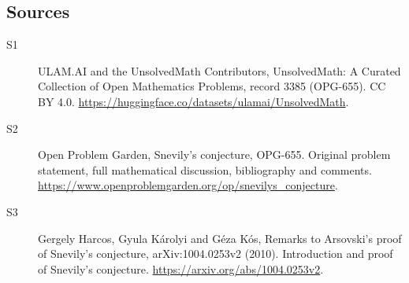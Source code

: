 \documentclass[11pt]{article}
\begin{document}
\subsection{Sources}
\begin{description}
\item[\hypertarget{source:3385:1}{S1}] ULAM.AI and the UnsolvedMath Contributors, UnsolvedMath: A Curated Collection of Open Mathematics Problems, record 3385 (OPG-655). CC BY 4.0. \url{https://huggingface.co/datasets/ulamai/UnsolvedMath}.
\item[\hypertarget{source:3385:2}{S2}] Open Problem Garden, Snevily's conjecture, OPG-655. Original problem statement, full mathematical discussion, bibliography and comments. \url{https://www.openproblemgarden.org/op/snevilys_conjecture}.
\item[\hypertarget{source:3385:3}{S3}] Gergely Harcos, Gyula Károlyi and Géza Kós, Remarks to Arsovski’s proof of Snevily’s conjecture, arXiv:1004.0253v2 (2010). Introduction and proof of Snevily’s conjecture. \url{https://arxiv.org/abs/1004.0253v2}.
\end{description}
\label{end:3385}
\end{document}
